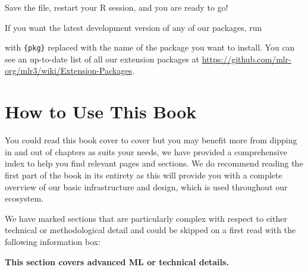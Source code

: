 Save the file, restart your R session, and you are ready to go!

If you want the latest development version of any of our packages, run

\begin{Shaded}
\begin{Highlighting}[]
\SpecialCharTok{::}\NormalTok{(}\NormalTok{)}
\end{Highlighting}
\end{Shaded}

with \texttt{\{pkg\}} replaced with the name of the package you want to
install. You can see an up-to-date list of all our extension packages at
\url{https://github.com/mlr-org/mlr3/wiki/Extension-Packages}.

\hypertarget{howtouse}{%
\section{How to Use This Book}\label{howtouse}}

You could read this book cover to cover but you may benefit more from dipping in and out of chapters as suits your needs, we have provided a comprehensive index to help you find relevant pages and sections.
We do recommend reading the first part of the book in its entirety as this will provide you with a complete overview of our basic infrastructure and design, which is used throughout our ecosystem.

We have marked sections that are particularly complex with respect to
either technical or methodological detail and could be skipped on a
first read with the following information box:

\begin{tcolorbox}[enhanced jigsaw, colframe=quarto-callout-note-color-frame, rightrule=.15mm, bottomrule=.15mm, toprule=.15mm, opacityback=0, colback=white, left=2mm, arc=.35mm, breakable, leftrule=.75mm]
\begin{minipage}[t]{5.5mm}
\textcolor{quarto-callout-note-color}{\faInfo}
\end{minipage}%
\begin{minipage}[t]{\textwidth - 5.5mm}

\textbf{This section covers advanced ML or technical
details.}\vspace{2mm}

\end{minipage}%
\end{tcolorbox}

